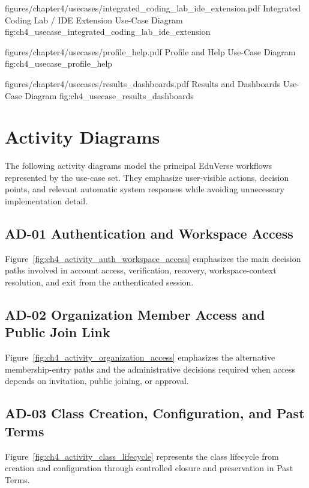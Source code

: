 \EduUseCasePdfFigure
  {figures/chapter4/usecases/integrated_coding_lab_ide_extension.pdf}
  {Integrated Coding Lab / IDE Extension Use-Case Diagram}
  {fig:ch4_usecase_integrated_coding_lab_ide_extension}

\EduUseCasePdfFigure
  {figures/chapter4/usecases/profile_help.pdf}
  {Profile and Help Use-Case Diagram}
  {fig:ch4_usecase_profile_help}

\EduUseCasePdfFigure
  {figures/chapter4/usecases/results_dashboards.pdf}
  {Results and Dashboards Use-Case Diagram}
  {fig:ch4_usecase_results_dashboards}

\clearpage

\section{Activity Diagrams}\label{sec:activity_diagrams}

The following activity diagrams model the principal EduVerse workflows
represented by the use-case set. They emphasize user-visible actions, decision
points, and relevant automatic system responses while avoiding unnecessary
implementation detail.

\begin{samepage}
\subsection*{AD-01 Authentication and Workspace Access}

Figure~\ref{fig:ch4_activity_auth_workspace_access} emphasizes the main
decision paths involved in account access, verification, recovery,
workspace-context resolution, and exit from the authenticated session.
\end{samepage}

\begin{samepage}
\subsection*{AD-02 Organization Member Access and Public Join Link}

Figure~\ref{fig:ch4_activity_organization_access} emphasizes the alternative
membership-entry paths and the administrative decisions required when access
depends on invitation, public joining, or approval.
\end{samepage}

\begin{samepage}
\subsection*{AD-03 Class Creation, Configuration, and Past Terms}

Figure~\ref{fig:ch4_activity_class_lifecycle} represents the class lifecycle
from creation and configuration through controlled closure and preservation in
Past Terms.
\end{samepage}

